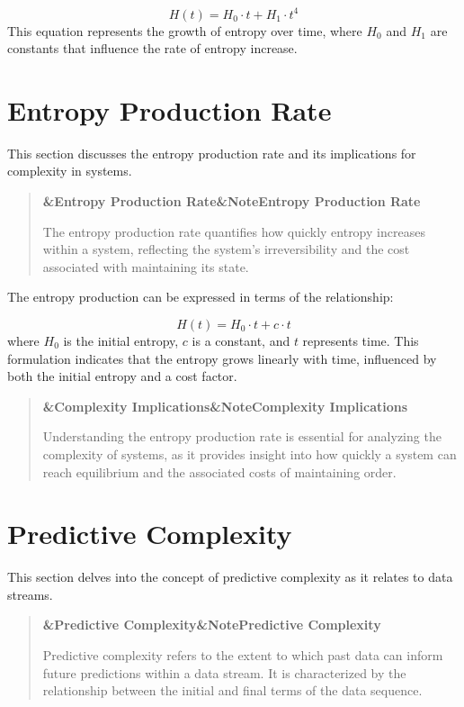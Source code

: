 \documentclass[a4paper]{article}
\newcommand{\boxheading}[1]{%
  \par\smallskip
  \noindent\textbf{\ifx&#1&Note\else#1\fi}\par
  \smallskip
}
\newenvironment{defbox}[1][]{%
  \begin{quote}\color{green!40!black}\boxheading{#1}\normalcolor
}{\end{quote}}
\newenvironment{rembox}[1][]{%
  \begin{quote}\color{black!70}\boxheading{#1}\normalcolor
}{\end{quote}}
\begin{document}
\begin{equation}
H(t) = H_0 \cdot t + H_1 \cdot t^4
\end{equation}
This equation represents the growth of entropy over time, where \( H_0 \) and \( H_1 \) are constants that influence the rate of entropy increase.

\section{Entropy Production Rate}
This section discusses the entropy production rate and its implications for complexity in systems.

\begin{defbox}[Entropy Production Rate]
The entropy production rate quantifies how quickly entropy increases within a system, reflecting the system's irreversibility and the cost associated with maintaining its state.
\end{defbox}

The entropy production can be expressed in terms of the relationship:

\begin{equation}
H(t) = H_0 \cdot t + c \cdot t
\end{equation}
where \( H_0 \) is the initial entropy, \( c \) is a constant, and \( t \) represents time. This formulation indicates that the entropy grows linearly with time, influenced by both the initial entropy and a cost factor.

\begin{rembox}[Complexity Implications]
Understanding the entropy production rate is essential for analyzing the complexity of systems, as it provides insight into how quickly a system can reach equilibrium and the associated costs of maintaining order.
\end{rembox}

\section{Predictive Complexity}
This section delves into the concept of predictive complexity as it relates to data streams.

\begin{defbox}[Predictive Complexity]
Predictive complexity refers to the extent to which past data can inform future predictions within a data stream. It is characterized by the relationship between the initial and final terms of the data sequence.
\end{defbox}
\end{document}

